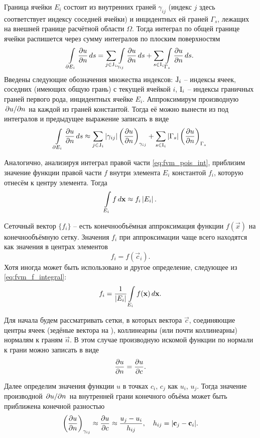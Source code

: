Граница ячейки $E_i$ состоит из внутренних граней $\gamma_{ij}$ (индекс $j$ здесь
соответствует индексу соседней ячейки)
и инцидентных ей граней $\Gamma_{s}$, лежащих на внешней границе расчётной области $\Omega$.
Тогда интеграл по общей границе ячейки распишется через сумму интегралов по плоским поверхностям
$$
\arint{\dfr{u}{n}}{\partial E_i}{s} = \sum_{j\in{{\rm J}_i}}\arint{\dfr{u}{n}}{\gamma_{ij}}{s} + \sum_{s\in{\rm I}_i}\arint{\dfr{u}{n}}{\Gamma_{s}}{s}.
$$
Введены следующие обозначения множества индексов: ${\rm J}_i$ -- индексы ячеек, соседних (имеющих общую грань) с текущей ячейкой $i$,
${\rm I}_i$ -- индексы граничных граней первого рода, инцидентных ячейке $E_i$.
Аппроксимирум производную $\dsfr{u}{n}$ на каждой из граней константой.
Тогда её можно вынести из под интегралов и предыдущее выражение записать в виде
\begin{equation}
\label{eq:fvm_gamma_integral}
\arint{\dfr{u}{n}}{\partial E_i}{s} \approx
\sum_{j\in{{\rm J}_i}}
    \left|
        \gamma_{ij}
    \right|
    \left(
        \dfr{u}{n}
    \right)_{\gamma_{ij}}
+\sum_{s\in{{\rm I}_i}}
    \left|
        \Gamma_{s}
    \right|
    \left(
        \dfr{u}{n}
    \right)_{\Gamma_{s}}
\end{equation}

Аналогично, анализируя интеграл правой части \cref{eq:fvm_pois_int},
приблизим значение функции правой части $f$ внутри элемента $E_i$ константой $f_i$,
которую отнесём к центру элемента. Тогда
\begin{equation}
\label{eq:fvm_f_integral}
\arint{f}{E_i}{\vec x} \approx f_i \left|E_i\right|.
\end{equation}

Сеточный вектор $\{f_i\}$ -- есть конечнообъёмная аппроксимация
функции $f(\vec x)$ на конечнообъёмную сетку.
Значения $f_i$ при аппроксимации чаще всего находятся как значения в центрах элементов
$$
f_i = f(\vec c_i).
$$
Хотя иногда может быть использовано и другое определение,
следующее из \eqref{eq:fvm_f_integral}:
$$
f_i = \frac{1}{\left| E_i \right|} \arint{f(\vec x)}{E_i}{\vec x}.
$$


Для начала будем рассматривать сетки, в
которых вектора $\vec c$, соединяющие центры ячеек (зедёные вектора на ),
коллинеарны (или почти коллинеарны) нормалям к граням $\vec n$.
В этом случае производную искомой функции по нормали к грани можно записать в виде
$$
\dfr{u}{n} = \dfr{u}{c}.
$$

Далее определим значения функции $u$ в точках $c_i$, $c_j$ как $u_i$, $u_j$.
Тогда значение производной $\dsfr{u}{n}$ на внутренней грани конечного объёма
может быть приближена конечной разностью
\begin{equation}
\label{eq:fvm_dudn_dudc}
\left(\dfr{u}{n}\right)_{\gamma_{ij}} \approx \dfr{u}{c} \approx \frac{u_j - u_i}{h_{ij}}, \quad h_{ij} = |\vec c_j - \vec c_i|.
\end{equation}

